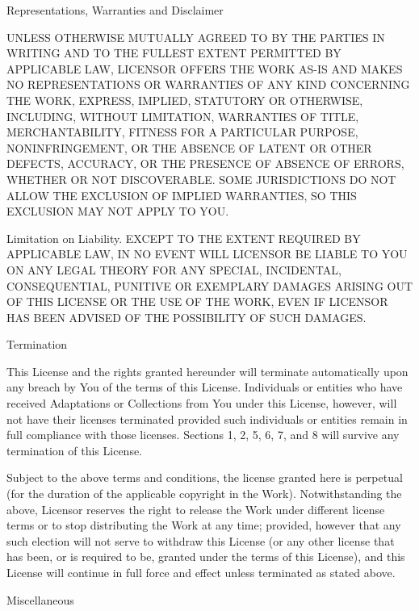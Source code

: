 \item
Representations, Warranties and Disclaimer

UNLESS OTHERWISE MUTUALLY AGREED TO BY THE PARTIES IN WRITING AND TO THE FULLEST EXTENT PERMITTED BY APPLICABLE LAW, LICENSOR OFFERS THE WORK AS-IS AND MAKES NO REPRESENTATIONS OR WARRANTIES OF ANY KIND CONCERNING THE WORK, EXPRESS, IMPLIED, STATUTORY OR OTHERWISE, INCLUDING, WITHOUT LIMITATION, WARRANTIES OF TITLE, MERCHANTABILITY, FITNESS FOR A PARTICULAR PURPOSE, NONINFRINGEMENT, OR THE ABSENCE OF LATENT OR OTHER DEFECTS, ACCURACY, OR THE PRESENCE OF ABSENCE OF ERRORS, WHETHER OR NOT DISCOVERABLE. SOME JURISDICTIONS DO NOT ALLOW THE EXCLUSION OF IMPLIED WARRANTIES, SO THIS EXCLUSION MAY NOT APPLY TO YOU.

\item
Limitation on Liability. EXCEPT TO THE EXTENT REQUIRED BY APPLICABLE LAW, IN NO EVENT WILL LICENSOR BE LIABLE TO YOU ON ANY LEGAL THEORY FOR ANY SPECIAL, INCIDENTAL, CONSEQUENTIAL, PUNITIVE OR EXEMPLARY DAMAGES ARISING OUT OF THIS LICENSE OR THE USE OF THE WORK, EVEN IF LICENSOR HAS BEEN ADVISED OF THE POSSIBILITY OF SUCH DAMAGES.

\item
Termination

    \startitemize[a]
    \item
    This License and the rights granted hereunder will terminate automatically upon any breach by You of the terms of this License. Individuals or entities who have received Adaptations or Collections from You under this License, however, will not have their licenses terminated provided such individuals or entities remain in full compliance with those licenses. Sections 1, 2, 5, 6, 7, and 8 will survive any termination of this License.

    \item
    Subject to the above terms and conditions, the license granted here is perpetual (for the duration of the applicable copyright in the Work). Notwithstanding the above, Licensor reserves the right to release the Work under different license terms or to stop distributing the Work at any time; provided, however that any such election will not serve to withdraw this License (or any other license that has been, or is required to be, granted under the terms of this License), and this License will continue in full force and effect unless terminated as stated above.
    \stopitemize

\item
Miscellaneous

